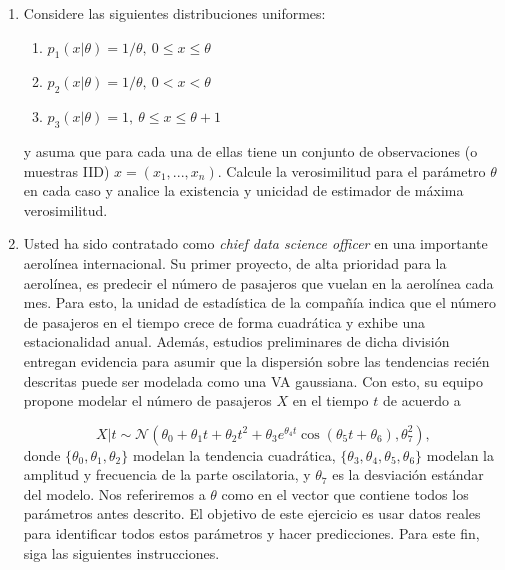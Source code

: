 \documentclass[11pt]{article}
\begin{document}
\begin{enumerate}\setlength{\itemsep}{0.4cm}

\item Considere las siguientes distribuciones uniformes: 
\begin{enumerate}
    \item $p_1(x|\theta) = 1/\theta,\ 0\leq x \leq \theta$
    \item $p_2(x|\theta) = 1/\theta,\ 0< x < \theta$
    \item $p_3(x|\theta) = 1,\ \theta\leq x \leq \theta+1$
\end{enumerate}
y asuma que para cada una de ellas tiene un conjunto de observaciones (o muestras IID) $x=(x_1,...,x_n)$. Calcule la verosimilitud para el parámetro $\theta$ en cada caso y analice la existencia y unicidad de estimador de máxima verosimilitud.

\item Usted ha sido contratado como  \textit{chief data science officer} en una importante aerolínea internacional. Su primer proyecto, de alta prioridad para la aerolínea, es predecir el número de pasajeros que vuelan en la aerolínea cada mes. Para esto, la unidad de estadística de la compañía indica que el número de pasajeros en el tiempo crece de forma cuadrática y exhibe una estacionalidad anual. Además, estudios preliminares de dicha división entregan evidencia para asumir que la dispersión sobre las tendencias recién descritas puede ser modelada como una VA gaussiana. Con esto, su equipo propone modelar el número de pasajeros $X$ en el tiempo $t$ de acuerdo a 

\begin{equation}
	X|t \sim \mathcal{N}\left(\theta_0 + \theta_1t + \theta_2t^2 + \theta_3e^{\theta_4t}\cos\left(\theta_5t+\theta_6\right),\theta_7^2\right),
\end{equation}
donde $\{\theta_0,\theta_1,\theta_2\}$ modelan la tendencia cuadrática, $\{\theta_3,\theta_4,\theta_5,\theta_6\}$ modelan la amplitud y frecuencia de la parte oscilatoria, y $\theta_7$ es la desviación estándar del modelo. Nos referiremos a $\theta$ como en el vector que contiene todos los parámetros antes descrito. El objetivo de este ejercicio es usar datos reales para identificar todos estos parámetros y hacer predicciones. Para este fin, siga las siguientes instrucciones. 


\end{enumerate}
\end{document}
